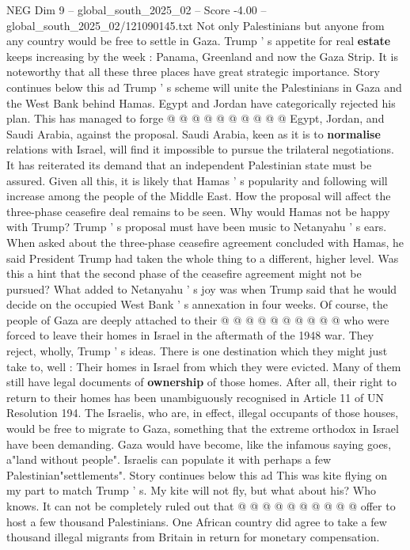 \begin{textsample}{NEG Dim 9 – global\_south\_2025\_02 – Score -4.00 – global\_south\_2025\_02/121090145.txt}
Not only Palestinians but anyone from any country would be free to settle in Gaza.
Trump ' s appetite for real \textbf{estate} keeps increasing by the week : Panama, Greenland and now the Gaza Strip.
It is noteworthy that all these three places have great strategic importance.
Story continues below this ad Trump ' s scheme will unite the Palestinians in Gaza and the West Bank behind Hamas.
Egypt and Jordan have categorically rejected his plan.
This has managed to forge @ @ @ @ @ @ @ @ @ @ Egypt, Jordan, and Saudi Arabia, against the proposal.
Saudi Arabia, keen as it is to \textbf{normalise} relations with Israel, will find it impossible to pursue the trilateral negotiations.
It has reiterated its demand that an independent Palestinian state must be assured.
Given all this, it is likely that Hamas ' s popularity and following will increase among the people of the Middle East.
How the proposal will affect the three-phase ceasefire deal remains to be seen.
Why would Hamas not be happy with Trump?
Trump ' s proposal must have been music to Netanyahu ' s ears.
When asked about the three-phase ceasefire agreement concluded with Hamas, he said President Trump had taken the whole thing to a different, higher level.
Was this a hint that the second phase of the ceasefire agreement might not be pursued?
What added to Netanyahu ' s joy was when Trump said that he would decide on the occupied West Bank ' s annexation in four weeks.
Of course, the people of Gaza are deeply attached to their @ @ @ @ @ @ @ @ @ @ who were forced to leave their homes in Israel in the aftermath of the 1948 war.
They reject, wholly, Trump ' s ideas.
There is one destination which they might just take to, well : Their homes in Israel from which they were evicted.
Many of them still have legal documents of \textbf{ownership} of those homes.
After all, their right to return to their homes has been unambiguously recognised in Article 11 of UN Resolution 194.
The Israelis, who are, in effect, illegal occupants of those houses, would be free to migrate to Gaza, something that the extreme orthodox in Israel have been demanding.
Gaza would have become, like the infamous saying goes, a"land without people".
Israelis can populate it with perhaps a few Palestinian"settlements".
Story continues below this ad This was kite flying on my part to match Trump ' s.
My kite will not fly, but what about his?
Who knows.
It can not be completely ruled out that @ @ @ @ @ @ @ @ @ @ offer to host a few thousand Palestinians.
One African country did agree to take a few thousand illegal migrants from Britain in return for monetary compensation.

\end{textsample}
